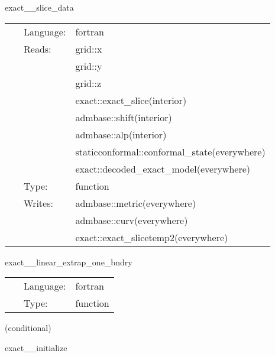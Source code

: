 \vspace{5mm}

\noindent {\bf } 

\hspace{5mm} exact\_\_slice\_data 

\hspace{5mm}{\it  } 


\hspace{5mm}

 \begin{tabular*}{160mm}{cll} 
~ & Language:  & fortran \\ 
~ & Reads:  & grid::x \\ 
~& ~ &grid::y\\ 
~& ~ &grid::z\\ 
~& ~ &exact::exact\_slice(interior)\\ 
~& ~ &admbase::shift(interior)\\ 
~& ~ &admbase::alp(interior)\\ 
~& ~ &staticconformal::conformal\_state(everywhere)\\ 
~& ~ &exact::decoded\_exact\_model(everywhere)\\ 
~ & Type:  & function \\ 
~ & Writes:  & admbase::metric(everywhere) \\ 
~& ~ &admbase::curv(everywhere)\\ 
~& ~ &exact::exact\_slicetemp2(everywhere)\\ 
\end{tabular*} 


\vspace{5mm}

\noindent {\bf } 

\hspace{5mm} exact\_\_linear\_extrap\_one\_bndry 

\hspace{5mm}{\it  } 


\hspace{5mm}

 \begin{tabular*}{160mm}{cll} 
~ & Language:  & fortran \\ 
~ & Type:  & function \\ 
\end{tabular*} 


\vspace{5mm}

   (conditional) 

\hspace{5mm} exact\_\_initialize 

